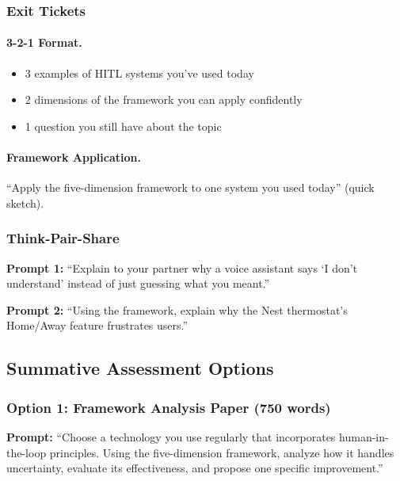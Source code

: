\subsubsection{Exit Tickets}

\paragraph{3-2-1 Format.}
\begin{itemize}
    \item 3 examples of HITL systems you've used today
    \item 2 dimensions of the framework you can apply confidently
    \item 1 question you still have about the topic
\end{itemize}

\paragraph{Framework Application.}
``Apply the five-dimension framework to one system you used today'' (quick sketch).

\subsubsection{Think-Pair-Share}

\textbf{Prompt 1:} ``Explain to your partner why a voice assistant says `I don't understand' instead of just guessing what you meant.''

\textbf{Prompt 2:} ``Using the framework, explain why the Nest thermostat's Home/Away feature frustrates users.''

\subsection{Summative Assessment Options}

\subsubsection{Option 1: Framework Analysis Paper (750 words)}

\textbf{Prompt:} ``Choose a technology you use regularly that incorporates human-in-the-loop principles. Using the five-dimension framework, analyze how it handles uncertainty, evaluate its effectiveness, and propose one specific improvement.''

